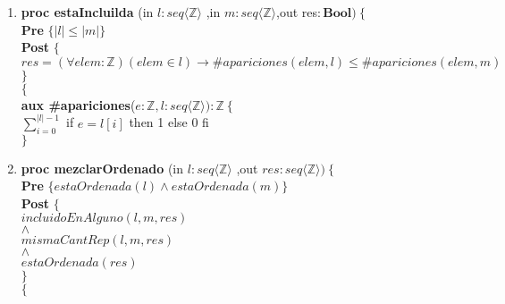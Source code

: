 \documentclass[a4paper]{article}
\begin{document}
\begin{enumerate}[label=\alph*)]
		\item
		
			\textbf{proc estaIncluilda }(in $l:seq\langle \mathbb{Z}\rangle$
				,in $m:seq\langle \mathbb{Z}\rangle$,out res$:\textbf{Bool} )\ \{$\smallskip \\
			\hspace*{6mm} \textbf{Pre }$\{|l| \leq |m|\}$\smallskip \\
			\hspace*{6mm} \textbf{Post }$\{$\\
			\hspace*{6mm} $res=(\forall elem:\mathbb{Z})(elem\in l)\rightarrow 
			\#apariciones(elem,l)\leq \#apariciones(elem,m)$\\
			\hspace*{6mm} $\}$\\
			$\{$\smallskip \\
			
			\textbf{aux \#apariciones}($e:\mathbb{Z},l: seq\langle \mathbb{Z}\rangle):\mathbb{Z}
			\ \{$\smallskip \\
			\hspace*{6mm}$\sum_{i=0}^{|l|-1}$ if $e=l[i]$ then 1 else 0 fi\\
			$\}$
			
		\item
			
			\textbf{proc mezclarOrdenado }(in $l:seq\langle \mathbb{Z}\rangle$
				,out $res:seq\langle \mathbb{Z}\rangle )\ \{$\smallskip \\
			\hspace*{6mm} \textbf{Pre }$\{ estaOrdenada(l)\wedge
			 estaOrdenada(m)\}$\smallskip \\
			\hspace*{6mm} \textbf{Post }$\{$\\
			\hspace*{6mm} $incluidoEnAlguno(l,m,res)$\\
			\hspace*{6mm} $\wedge$\\
			\hspace*{6mm} $mismaCantRep(l,m,res)$\\
			\hspace*{6mm} $\wedge$\\
			\hspace*{6mm} $estaOrdenada(res)$\\
			\hspace*{6mm} $\}$\\
			$\{$\smallskip \\
			

\end{enumerate}
\end{document}
